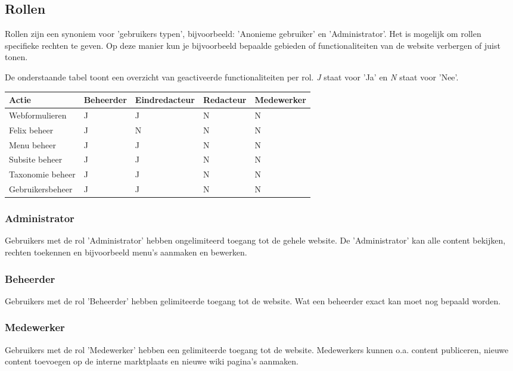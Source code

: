 \subsection{Rollen}\label{rollen}

Rollen zijn een synoniem voor 'gebruikers typen', bijvoorbeeld: 'Anonieme gebruiker' en 'Administrator'.  Het is mogelijk om rollen specifieke rechten te geven. Op deze manier kun je bijvoorbeeld bepaalde gebieden of functionaliteiten van de website verbergen of juist tonen. 

De onderstaande tabel toont een overzicht van geactiveerde functionaliteiten per rol.
\emph{J} staat voor 'Ja' en \emph{N} staat voor 'Nee'. 

\begin{tabularx}{\textwidth}{ | p{5cm} |X|X|X|X| }
  \hline
  Actie & Beheerder & Eindredacteur & Redacteur & Medewerker \\ \hline
  Webformulieren  & J  & J  & N & N  \\ \hline
  Felix beheer  & J  & N  & N & N  \\ \hline
  Menu beheer  & J  & J  & N & N  \\ \hline
  Subsite beheer  & J  & J  & N & N  \\ \hline
  Taxonomie beheer  & J  & J  & N & N  \\ \hline
  Gebruikersbeheer  & J  & J  & N & N  \\ \hline
\end{tabularx}


\subsubsection{Administrator}\label{administrator}
Gebruikers met de rol 'Administrator' hebben ongelimiteerd toegang tot de gehele website. De 'Administrator' kan alle content bekijken, rechten toekennen en bijvoorbeeld menu's aanmaken en bewerken.

\subsubsection{Beheerder}\label{beheerder}
Gebruikers met de rol 'Beheerder' hebben gelimiteerde toegang tot de website. Wat een beheerder exact kan moet nog bepaald worden.

\subsubsection{Medewerker}\label{medewerker}
Gebruikers met de rol 'Medewerker' hebben een gelimiteerde toegang tot de website. Medewerkers kunnen o.a. content publiceren, nieuwe content toevoegen op de interne marktplaats en nieuwe wiki pagina's aanmaken.

